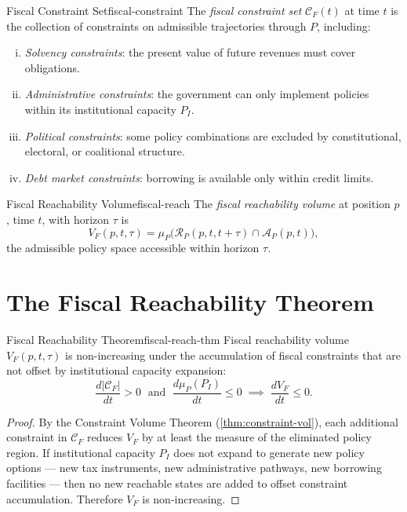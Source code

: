 \documentclass[12pt,twoside,openright]{book}
\newcommand{\reach}{\mathcal{R}}
\newcommand{\adm}{\mathcal{A}}
\begin{document}
\begin{definition}{Fiscal Constraint Set}{fiscal-constraint}
  The \emph{fiscal constraint set} $\mathcal{C}_F(t)$
  at time $t$ is the collection of constraints on
  admissible trajectories through $P$, including:
  \begin{enumerate}[(i)]
    \item \emph{Solvency constraints}: the present value
          of future revenues must cover obligations.
    \item \emph{Administrative constraints}: the government
          can only implement policies within its
          institutional capacity $P_I$.
    \item \emph{Political constraints}: some policy
          combinations are excluded by constitutional,
          electoral, or coalitional structure.
    \item \emph{Debt market constraints}: borrowing is
          available only within credit limits.
  \end{enumerate}
\end{definition}

\begin{definition}{Fiscal Reachability Volume}{fiscal-reach}
  The \emph{fiscal reachability volume} at position $p$,
  time $t$, with horizon $\tau$ is
  \[
    V_F(p, t, \tau)
    = \mu_P\!\bigl(
        \reach_P(p, t, t+\tau)
        \cap \adm_P(p, t)
      \bigr),
  \]
  the admissible policy space accessible within horizon
  $\tau$.
\end{definition}

\section{The Fiscal Reachability Theorem}

\begin{theorem}{Fiscal Reachability Theorem}{fiscal-reach-thm}
  Fiscal reachability volume $V_F(p,t,\tau)$ is
  non-increasing under the accumulation of fiscal
  constraints that are not offset by institutional
  capacity expansion:
  \[
    \frac{d|\mathcal{C}_F|}{dt} > 0
    \;\text{ and }\;
    \frac{d\mu_P(P_I)}{dt} \le 0
    \;\implies\;
    \frac{dV_F}{dt} \le 0.
  \]
\end{theorem}

\begin{proof}
  By the Constraint Volume Theorem
  (\cref{thm:constraint-vol}), each additional constraint
  in $\mathcal{C}_F$ reduces $V_F$ by at least
  the measure of the eliminated policy region.
  If institutional capacity $P_I$ does not expand to
  generate new policy options — new tax instruments,
  new administrative pathways, new borrowing facilities
  — then no new reachable states are added to offset
  constraint accumulation.
  Therefore $V_F$ is non-increasing.
\end{proof}
\end{document}
